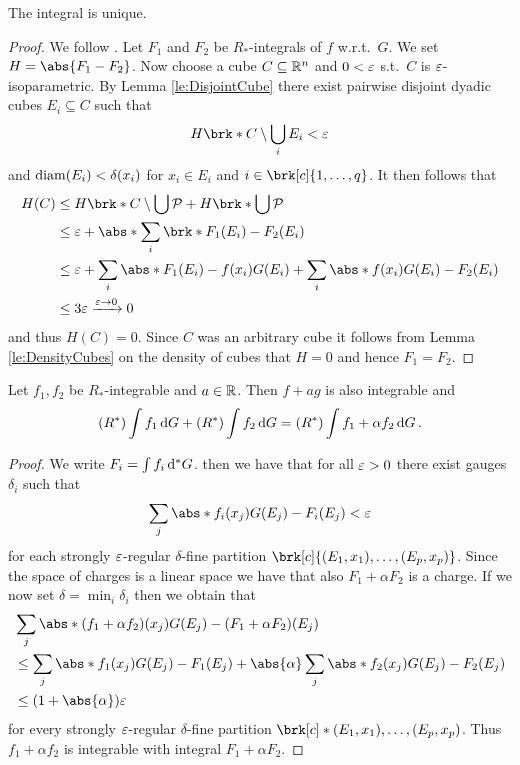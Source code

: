 \begin{claim}
The integral is unique.
\end{claim}
\begin{proof}
We follow \cite[Proposition 3.4]{Pfe2016}. Let $F_1$ and $F_2$ be $R_*$-integrals of $f$ w.r.t.\ $G$. We set $H=\abs{F_1-F_2}$. Now choose a cube $C\subseteq \mathbb{R}^n$ and $0<\varepsilon$ s.t.\ $C$ is $\varepsilon$-isoparametric. By Lemma \ref{le:DisjointCube} there exist pairwise disjoint dyadic cubes $E_i\subseteq C$ such that
\begin{align*}
	H\brk*{C\setminus \bigcup_iE_i}<\e
\end{align*}
and $\operatorname{diam}(E_i)<\delta(x_i)$ for $x_i\in E_i$ and $i\in\brk[c]{1,\dots,q}$. It then follows that
\begin{align*}
	H(C)
	&\leq H\brk*{C\setminus \bigcup\cP}+H\brk*{\bigcup\cP} \\
	&\leq\e+\abs*{\sum_i\brk*{F_1(E_i)-F_2(E_i)}} \\
	&\leq \e+\sum_i\abs*{F_1(E_i)-f(x_i)G(E_i)} +\sum_i\abs*{f(x_i)G(E_i)-F_2(E_i)} \\
	&\leq 3\e\xrightarrow{\e\to0}0
\end{align*}
and thus $H(C)=0$. Since $C$ was an arbitrary cube it follows from 
Lemma \ref{le:DensityCubes} on the density of cubes that $H=0$ and hence $F_1=F_2$.

\end{proof}

\begin{claim}
Let $f_1,f_2$ be $R_*$-integrable and $a\in\mathbb{R}$. Then $f+ag$ is also integrable and
\begin{align*}
	(R^*)\int f_1\,\mathrm{d} G + (R^*)\int f_2\,\mathrm{d} G=(R^*)\int f_1+\alpha f_2\,\mathrm{d} G\,.
\end{align*}
\end{claim}

\begin{proof}
We write $F_i=\int f_i\,\mathrm{d} ^*G$. then we have that for all $\varepsilon>0$ there exist gauges $\delta_i$ such that
\begin{align*}
	\sum_j\abs*{f_i(x_j)G(E_j)-F_i(E_j)}<\e
\end{align*}
for each strongly $\varepsilon$-regular $\delta$-fine partition $\brk[c]{(E_1,x_1),\dots,(E_p,x_p)}$. Since the space of charges is a linear space we have that also $F_1+\alpha F_2$ is a charge.
If we now set $\delta=\min_i\delta_i$ then we obtain that
\begin{align*}
	&\sum_j\abs*{(f_1+\alpha f_2)(x_j)G(E_j)-(F_1+\alpha F_2)(E_j)} \\
	&\leq \sum_j\abs*{f_1(x_j)G(E_j)-F_1(E_j)}+\abs{\alpha}\sum_j\abs*{f_2(x_j)G(E_j)-F_2(E_j)} \\
	&\leq (1+\abs{\alpha})\e
\end{align*}
for every strongly $\varepsilon$-regular $\delta$-fine partition $\brk[c]*{(E_1,x_1),\dots,(E_p,x_p)}$. Thus $f_1+\alpha f_2$ is integrable with integral $F_1+\alpha F_2$.
\end{proof}


